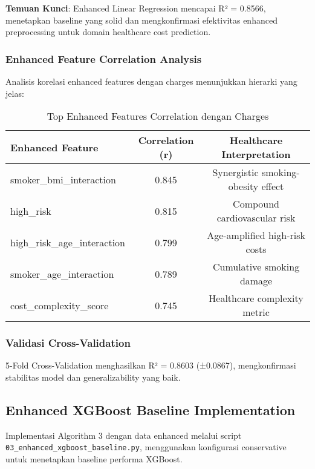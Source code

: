 \textbf{Temuan Kunci}: Enhanced Linear Regression mencapai R² = 0.8566, menetapkan baseline yang solid dan mengkonfirmasi efektivitas enhanced preprocessing untuk domain healthcare cost prediction.

\subsubsection{Enhanced Feature Correlation Analysis}
Analisis korelasi enhanced features dengan charges menunjukkan hierarki yang jelas:

\begin{table}[H]
\centering
\caption{Top Enhanced Features Correlation dengan Charges}
\label{tab:enhanced-correlations}
\begin{tabular}{|l|c|c|}
\hline
\textbf{Enhanced Feature} & \textbf{Correlation (r)} & \textbf{Healthcare Interpretation} \\
\hline
smoker\_bmi\_interaction & 0.845 & Synergistic smoking-obesity effect \\
high\_risk & 0.815 & Compound cardiovascular risk \\
high\_risk\_age\_interaction & 0.799 & Age-amplified high-risk costs \\
smoker\_age\_interaction & 0.789 & Cumulative smoking damage \\
cost\_complexity\_score & 0.745 & Healthcare complexity metric \\
\hline
\end{tabular}
\end{table}

\subsubsection{Validasi Cross-Validation}
5-Fold Cross-Validation menghasilkan R² = 0.8603 (±0.0867), mengkonfirmasi stabilitas model dan generalizability yang baik.

\subsection{Enhanced XGBoost Baseline Implementation}
\label{subsec:enhanced-xgboost-baseline}

Implementasi Algorithm 3 dengan data enhanced melalui script \texttt{03\_enhanced\_xgboost\_baseline.py}, menggunakan konfigurasi conservative untuk menetapkan baseline performa XGBoost.

